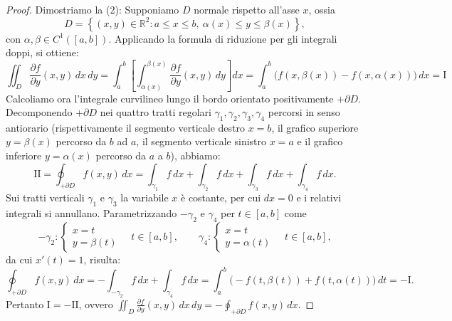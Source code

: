 \begin{proof}
Dimostriamo la (2):
Supponiamo $D$ normale rispetto all'asse $x$, ossia
\[
D = \left\{ (x,y) \in \mathbb{R}^2 : a \le x \le b,\ \alpha(x) \le y \le \beta(x) \right\},
\]
con $\alpha, \beta \in C^1([a,b])$. Applicando la formula di riduzione per gli integrali doppi, si ottiene:
\[
\iint_D \frac{\partial f}{\partial y}(x,y) \, dx \, dy 
= \int_a^b \left[ \int_{\alpha(x)}^{\beta(x)} \frac{\partial f}{\partial y}(x,y) \, dy \right] dx 
= \int_a^b \big( f(x, \beta(x)) - f(x, \alpha(x)) \big) \, dx = \mathrm{I}
\]
Calcoliamo ora l'integrale curvilineo lungo il bordo orientato positivamente $+\partial D$. Decomponendo $+\partial D$ nei quattro tratti regolari $\gamma_1, \gamma_2, \gamma_3, \gamma_4$ percorsi in senso antiorario (rispettivamente il segmento verticale destro $x=b$, il grafico superiore $y=\beta(x)$ percorso da $b$ ad $a$, il segmento verticale sinistro $x=a$ e il grafico inferiore $y=\alpha(x)$ percorso da $a$ a $b$), abbiamo:
\[
\mathrm{II} = \oint_{+\partial D} f(x,y) \, dx 
= \int_{\gamma_1} f \, dx + \int_{\gamma_2} f \, dx + \int_{\gamma_3} f \, dx + \int_{\gamma_4} f \, dx.
\]
Sui tratti verticali $\gamma_1$ e $\gamma_3$ la variabile $x$ è costante, per cui $dx = 0$ e i relativi integrali si annullano. Parametrizzando $-\gamma_2$ e $\gamma_4$ per $t \in [a,b]$ come
\[
-\gamma_2 : \begin{cases} x = t \\ y = \beta(t) \end{cases} \quad t \in [a,b], 
\qquad 
\gamma_4 : \begin{cases} x = t \\ y = \alpha(t) \end{cases} \quad t \in [a,b],
\]
da cui $x'(t) = 1$, risulta:
\[
\oint_{+\partial D} f(x,y) \, dx 
= -\int_{-\gamma_2} f \, dx + \int_{\gamma_4} f \, dx 
= \int_a^b \big( -f(t, \beta(t)) + f(t, \alpha(t)) \big) \, dt 
= -\mathrm{I}.
\]
Pertanto $\mathrm{I} = -\mathrm{II}$, ovvero $\iint_D \frac{\partial f}{\partial y}(x,y) \, dx \, dy = -\oint_{+\partial D} f(x,y) \, dx$.


\end{proof}
